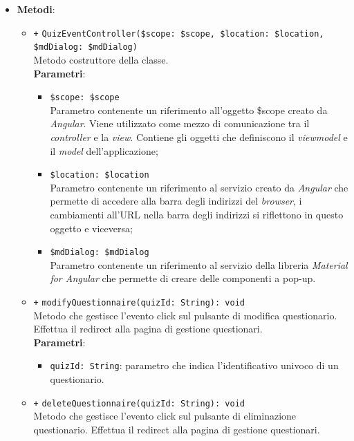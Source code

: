 \begin{itemize}
\begin{itemize}
	\end{itemize}
	\item \textbf{Metodi}:
	\begin{itemize}
		\item \texttt{+} \texttt{QuizEventController(\$scope: \$scope, \$location: \$location, \$mdDialog: \$mdDialog)} \\ Metodo costruttore della classe. \\
		\textbf{Parametri}:
		\begin{itemize}
			\item \texttt{\$scope: \$scope} \\
			Parametro contenente un riferimento all'oggetto \$scope creato da \textit{Angular}. Viene utilizzato come mezzo di comunicazione tra il \textit{controller} e la \textit{view}. Contiene gli oggetti che definiscono il \textit{viewmodel} e il \textit{model} dell'applicazione;
			\item \texttt{\$location: \$location} \\
		    Parametro contenente un riferimento al servizio creato da \textit{Angular} che permette di accedere alla barra degli indirizzi del \textit{browser}, i cambiamenti all'URL nella barra degli indirizzi si riflettono in questo oggetto e viceversa;
			\item \texttt{\$mdDialog: \$mdDialog} \\
			Parametro contenente un riferimento al servizio della libreria \textit{Material for Angular} che permette di creare delle componenti a pop-up.
		\end{itemize}
		\item \texttt{+} \texttt{modifyQuestionnaire(quizId: String): void} \\
		Metodo che gestisce l'evento click sul pulsante di modifica questionario. Effettua il redirect alla pagina di gestione questionari. \\
		\textbf{Parametri}:
		\begin{itemize}
			\item \texttt{quizId: String}: parametro che indica l'identificativo univoco di un questionario.
		\end{itemize}
		\item \texttt{+} \texttt{deleteQuestionnaire(quizId: String): void} \\
		Metodo che gestisce l'evento click sul pulsante di eliminazione questionario. Effettua il redirect alla pagina di gestione questionari. \\

\end{itemize}
\end{itemize}

